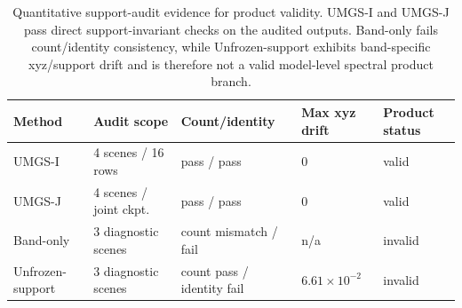 \begin{table}[H]
    \caption{Quantitative support-audit evidence for product validity. UMGS-I and UMGS-J pass direct support-invariant checks on the audited outputs. Band-only fails count/identity consistency, while Unfrozen-support exhibits band-specific xyz/support drift and is therefore not a valid model-level spectral product branch.}
    \label{tab:supp-support-audit-quant}
    \centering
    \tiny
    \setlength{\tabcolsep}{2pt}
    \begin{tabular}{@{}p{}p{}p{}p{}p{}@{}}
        \toprule
        Method & Audit scope & Count/identity & Max xyz drift & Product status \\
        \midrule
        UMGS-I & 4 scenes / 16 rows & pass / pass & 0 & valid \\
        UMGS-J & 4 scenes / joint ckpt. & pass / pass & 0 & valid \\
        Band-only & 3 diagnostic scenes & count mismatch / fail & n/a & invalid \\
        Unfrozen-support & 3 diagnostic scenes & count pass / identity fail & $6.61{\times}10^{-2}$ & invalid \\
        \bottomrule
    \end{tabular}
\end{table}
